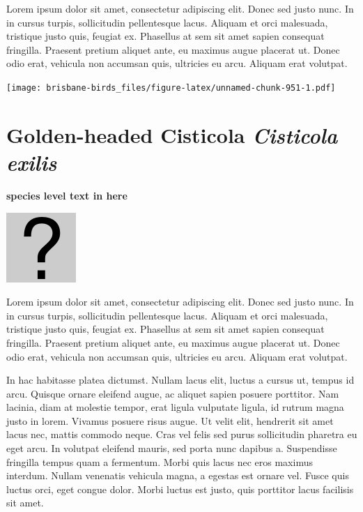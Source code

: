 \documentclass[]{book}
\let\origfigure\figure
\let\endorigfigure\endfigure
\renewenvironment{figure}[1][2] {
  \expandafter\origfigure\expandafter[H]
} {
  \endorigfigure
}
\begin{document}
Lorem ipsum dolor sit amet, consectetur adipiscing elit. Donec sed justo
nunc. In in cursus turpis, sollicitudin pellentesque lacus. Aliquam et
orci malesuada, tristique justo quis, feugiat ex. Phasellus at sem sit
amet sapien consequat fringilla. Praesent pretium aliquet ante, eu
maximus augue placerat ut. Donec odio erat, vehicula non accumsan quis,
ultricies eu arcu. Aliquam erat volutpat.

\texttt{[image: brisbane-birds\_files/figure-latex/unnamed-chunk-951-1.pdf]}

\section{\texorpdfstring{Golden-headed Cisticola \emph{Cisticola
exilis}}{Golden-headed Cisticola Cisticola exilis}}\label{golden-headed-cisticola-cisticola-exilis}

\textbf{species level text in here}

\begin{figure}
\centering
\includegraphics{assets/missing.png}
\caption{No image for species}
\end{figure}

Lorem ipsum dolor sit amet, consectetur adipiscing elit. Donec sed justo
nunc. In in cursus turpis, sollicitudin pellentesque lacus. Aliquam et
orci malesuada, tristique justo quis, feugiat ex. Phasellus at sem sit
amet sapien consequat fringilla. Praesent pretium aliquet ante, eu
maximus augue placerat ut. Donec odio erat, vehicula non accumsan quis,
ultricies eu arcu. Aliquam erat volutpat.

In hac habitasse platea dictumst. Nullam lacus elit, luctus a cursus ut,
tempus id arcu. Quisque ornare eleifend augue, ac aliquet sapien posuere
porttitor. Nam lacinia, diam at molestie tempor, erat ligula vulputate
ligula, id rutrum magna justo in lorem. Vivamus posuere risus augue. Ut
velit elit, hendrerit sit amet lacus nec, mattis commodo neque. Cras vel
felis sed purus sollicitudin pharetra eu eget arcu. In volutpat eleifend
mauris, sed porta nunc dapibus a. Suspendisse fringilla tempus quam a
fermentum. Morbi quis lacus nec eros maximus interdum. Nullam venenatis
vehicula magna, a egestas est ornare vel. Fusce quis luctus orci, eget
congue dolor. Morbi luctus est justo, quis porttitor lacus facilisis sit
amet.
\end{document}
